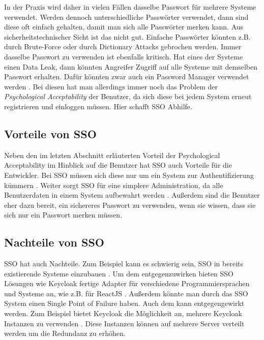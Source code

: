 In der Praxis wird daher in vielen Fällen dasselbe Passwort für mehrere Systeme verwendet. Werden dennoch unterschiedliche Passwörter verwendet, dann sind diese oft einfach gehalten, damit man sich alle Passwörter merken kann. Aus sicherheitstechnischer Sicht ist das nicht gut. Einfache Passwörter könnten z.B. durch Brute-Force oder durch Dictionary Attacks gebrochen werden. Immer dasselbe Passwort zu verwenden ist ebenfalls kritisch. Hat eines der Systeme einen Data Leak, dann könnten Angreifer Zugriff auf alle Systeme mit demselben Passwort erhalten. Dafür könnten zwar auch ein Password Manager verwendet werden \cite{EB34}. Bei diesen hat man allerdings immer noch das Problem der \textit{Psychological Acceptability} der Benutzer, da sich diese bei jedem System erneut registrieren und einloggen müssen. Hier schafft SSO Abhilfe.

\subsection{Vorteile von SSO}


Neben den im letzten Abschnitt erläuterten Vorteil der Psychological Acceptability im Hinblick auf die Benutzer hat SSO auch Vorteile für die Entwickler. Bei SSO müssen sich diese nur um ein System zur Authentifizierung kümmern \cite{EB34}. Weiter sorgt SSO für eine simplere Administration, da alle Benutzerdaten in einem System aufbewahrt werden \cite{EB34}. Außerdem sind die Benutzer eher dazu bereit, ein sichereres Passwort zu verwenden, wenn sie wissen, dass sie sich nur ein Passwort merken müssen.

\subsection{Nachteile von SSO}

SSO hat auch Nachteile. Zum Beispiel kann es schwierig sein, SSO in bereits existierende Systeme einzubauen \cite{EB34}. Um dem entgegenzuwirken bieten SSO Lösungen wie Keycloak fertige Adapter für verschiedene Programmiersprachen und Systeme an, wie z.B. für ReactJS \cite{EB35} \cite{EB36}. Außerdem könnte man durch das SSO System einen Single Point of Failure haben. Auch dem kann entgegengewirkt werden. Zum Beispiel bietet Keycloak die Möglichkeit an, mehrere Keycloak Instanzen zu verwenden \cite{EB33}. Diese Instanzen können auf mehrere Server verteilt werden um die Redundanz zu erhöhen. %

